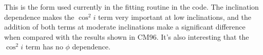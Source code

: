 \documentclass{article}
\begin{document}
This is the form used currently in the fitting routine in the code. The inclination dependence makes the $\cos^2i$ term very important at low inclinations, and the addition of both terms at moderate inclinations make a significant difference when compared with the results shown in CM96. It's also interesting that the $\cos^2i$ term has no $\phi$ dependence.
\end{document}
